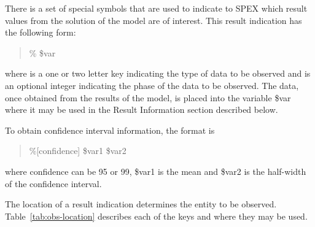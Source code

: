 There is a set of special symbols that are used to indicate to SPEX
which result values from the solution of the model are of interest.
This result indication has the following form:
\begin{quotation}
  \% \$var
\end{quotation}
where  is a one or two letter key indicating the type of data to be observed and
 is an optional integer indicating the phase of the data to be observed.  The data, once
obtained from the results of the model, is placed into the variable \$var where it may be used in the Result
Information section described below.

To obtain confidence interval information, the format is
\begin{quotation}
  \%[confidence] \$var1 \$var2
\end{quotation}
where confidence can be 95 or 99, \$var1 is the mean and \$var2 is the half-width of the confidence interval.

The location of a result indication determines the entity to be observed.  Table~\ref{tab:obs-location}
describes each of the keys and where they may be used.

